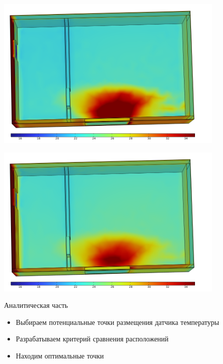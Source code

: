 \documentclass[14pt,aspectratio=169,hyperref={pdftex,unicode},xcolor=dvipsnames]{beamer}
\begin{document}
\begin{frame} \begin{center}
\includegraphics[width=11cm]{images/solar_radiation/solar_7.png}
\end{center} \end{frame}
\begin{frame} \begin{center}
\includegraphics[width=11cm]{images/solar_radiation/solar_8.png}
\end{center} \end{frame}



\begin{frame}{Аналитическая часть}

\begin{itemize}
\item Выбираем потенциальные точки размещения датчика температуры
\item Разрабатываем критерий сравнения расположений
\item Находим оптимальные точки
\end{itemize}

\end{frame}
\end{document}
